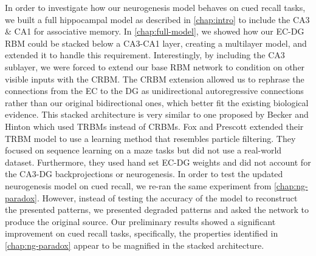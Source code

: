 In order to investigate how our neurogenesis model behaves on cued recall tasks, we 
built a full hippocampal model as described in \cref{chap:intro} to include the 
CA3 \& CA1 for associative memory. 
In \cref{chap:full-model}, we showed how our \ac{EC}-\ac{DG} \ac{RBM} could be 
stacked below a CA3-CA1 layer, creating a multilayer model,
and extended it to handle this requirement. 
Interestingly, by including the CA3 sublayer, 
we were forced to extend our base \ac{RBM} network to condition on other visible inputs with the \ac{CRBM}. 
The \ac{CRBM} extension allowed us to rephrase the connections from the \ac{EC} to the \ac{DG} as 
unidirectional autoregressive connections rather than our original bidirectional ones, which better fit 
the existing biological evidence. 
This stacked architecture 
is very similar to one proposed by Becker and Hinton \citeyearpar{becker-hinton-SFN-abstract} 
which used \acp{TRBM} instead of \acp{CRBM}.
Fox and Prescott \citeyearpar{hippocampal-trbm} extended their \ac{TRBM}
model to use a learning method that resembles particle filtering.
They focused on sequence learning on a maze tasks 
but did not use a real-world dataset.
Furthermore, they used hand set \ac{EC}-\ac{DG} weights and did 
not account for the CA3-\ac{DG} backprojections or neurogenesis.
In order to test the updated neurogenesis model on 
cued recall, we re-ran the same experiment from \cref{chap:ng-paradox}.
However, instead of 
testing the accuracy of the model to reconstruct the presented patterns, we presented degraded patterns 
and asked the network to produce the original source. 
Our preliminary results showed a significant 
improvement on cued recall tasks, specifically, the 
properties identified in \cref{chap:ng-paradox} appear 
to be magnified in the stacked architecture.

